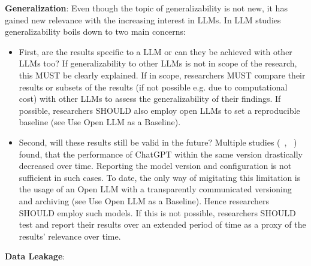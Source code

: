 \textbf{Generalization}:
Even though the topic of generalizability is not new, it has gained new relevance with the increasing interest in LLMs. In LLM studies generalizability boils down to two main concerns: 
\begin{itemize}
  \item First, are the results specific to a LLM or can they be achieved with other LLMs too? If generalizability to other LLMs is not in scope of the research, this MUST be clearly explained. If in scope, researchers MUST compare their results or subsets of the results (if not possible e.g. due to computational cost) with other LLMs to assess the generalizability of their findings. If possible, researchers SHOULD also employ open LLMs to set a reproducible baseline (see Use Open LLM as a Baseline).
  \item Second, will these results still be valid in the future? Multiple studies (~\cite{DBLP:journals/corr/abs-2307-09009}, ~\cite{doi:10.1148/radiol.232411}) found, that the performance of ChatGPT within the same version drastically decreased over time. Reporting the model version and configuration is not sufficient in such cases. To date, the only way of migitating this limitation is the usage of an Open LLM with a transparently communicated versioning and archiving (see Use Open LLM as a Baseline). Hence researchers SHOULD employ such models. If this is not possible, researchers SHOULD test and report their results over an extended period of time as a proxy of the results' relevance over time.
\end{itemize}

\textbf{Data Leakage}:


